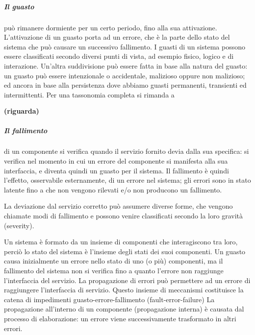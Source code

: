 \documentclass[14pt]{extarticle}
\begin{document}
\subparagraph{Il guasto} può rimanere dormiente per un certo periodo, fino alla sua attivazione. L’attivazione di un guasto porta ad un errore, che è la parte dello
stato del sistema che può causare un successivo fallimento. 
I guasti di un sistema possono essere classificati secondo diversi punti di vista, ad esempio
fisico, logico e di interazione. Un’altra suddivisione può essere fatta in base
alla natura del guasto: un guasto può essere intenzionale o accidentale, malizioso oppure non malizioso; ed ancora in base alla persistenza dove abbiamo
guasti permanenti, transienti ed intermittenti. Per una tassonomia completa
si rimanda a \cite{avizienis2004basic} 

\textbf{(riguarda)}
\subparagraph{Il fallimento} di un componente si verifica quando il servizio fornito devia
dalla sua specifica: si verifica nel momento in cui un errore del componente
si manifesta alla sua interfaccia, e diventa quindi un guasto per il sistema. Il
fallimento è quindi l’effetto, osservabile esternamente, di un errore nel sistema; gli errori sono in stato latente fino a che non vengono rilevati e/o non
producono un fallimento.

La deviazione dal servizio corretto può assumere diverse forme, che vengono chiamate modi di fallimento e possono venire classificati secondo la loro
gravità (severity).

Un sistema è formato da un insieme di componenti che interagiscono tra
loro, perciò lo stato del sistema è l’insieme degli stati dei suoi componenti. Un
guasto causa inizialmente un errore nello stato di uno (o più) componenti, ma
il fallimento del sistema non si verifica fino a quanto l’errore non raggiunge l’interfaccia del servizio. La propagazione di errori può permettere ad un errore
di raggiungere l’interfaccia di servizio. Questo insieme di meccanismi costituisce la catena di impedimenti guasto-errore-fallimento (fault-error-failure)
La propagazione all’interno di un componente (propagazione interna) è
causata dal processo di elaborazione: un errore viene successivamente trasformato in altri errori.
\end{document}
